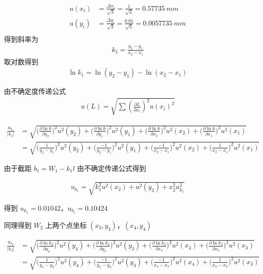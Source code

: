 \documentclass[UTF8]{ctexart}
\begin{document}
\begin{align*}
    u(x_i) &= \frac{\Delta x_i}{\sqrt{3}} = \frac{1}{\sqrt{3}} = 0.57735 \ mm \\
    u(y_i) &= \frac{\Delta y_i}{\sqrt{3}} = \frac{0.01}{\sqrt{3}} = 0.0057735 \ mm \\
\end{align*}
得到斜率为
\begin{align*}
    k_1 = \frac{y_2 - y_1}{x_2 - x_1}
\end{align*}
取对数得到
\begin{align*}
    \ln{k_1} = \ln{(y_2 - y_1)} - \ln{(x_2 - x_1)}
\end{align*}

由不确定度传递公式
\begin{align*}
    u(L) = \sqrt{\sum (\frac{\partial L}{\partial x_i})^2u(x_i)^2 } 
\end{align*}


\begin{align*}
    \frac{u_{k_1}}{|k_1|} &= \sqrt{ 
    \Big(   \frac{\partial \ln{k} }{\partial y_2}        \Big)^2u^2(y_2)     +
    \Big(   \frac{\partial \ln{k} }{\partial y_1}        \Big)^2u^2(y_1)     +
    \Big(   \frac{\partial \ln{k} }{\partial x_2}        \Big)^2u^2(x_2)     +
    \Big(   \frac{\partial \ln{k} }{\partial x_1}        \Big)^2u^2(x_1)  
    } \\
    &= \sqrt{ 
    \Big(   \frac{1 }{y_2 - y_1}        \Big)^2u^2(y_2)     +
    \Big(   \frac{-1 }{y_2 - y_1}        \Big)^2u^2(y_1)     +
    \Big(   \frac{-1 }{x_2 - x_1}        \Big)^2u^2(x_2)     +
    \Big(   \frac{1 }{x_2 - x_1}        \Big)^2u^2(x_1)  
    }
\end{align*}

由于截距 $b_1 = W_1 - k_1l$
由不确定传递公式得到

\begin{align*}
    u_{b_1} = \sqrt{
    k_1^2u^2(x_2) +
    u^2(y_2) +
    x_2^2u^2_{k_1}
     }
\end{align*}

得到 $u_{k_1} = 0.01042$，$u_{b_1} = 0.10424$

同理得到 $W_2$ 上两个点坐标 $(x_3,y_3)$，$(x_4,y_4)$

\begin{align*}
    \frac{u_{k_2}}{|k_2|} &= \sqrt{ 
    \Big(   \frac{\partial \ln{k_2} }{\partial y_4}        \Big)^2u^2(y_4)     +
    \Big(   \frac{\partial \ln{k_2} }{\partial y_3}        \Big)^2u^2(y_3)     +
    \Big(   \frac{\partial \ln{k_2} }{\partial x_4}        \Big)^2u^2(x_4)     +
    \Big(   \frac{\partial \ln{k_2} }{\partial x_3}        \Big)^2u^2(x_3)  
    } \\
    &= \sqrt{ 
    \Big(   \frac{1 }{y_4 - y_3}        \Big)^2u^2(y_4)     +
    \Big(   \frac{-1 }{y_4 - y_3}        \Big)^2u^2(y_3)     +
    \Big(   \frac{-1 }{x_4 - x_3}        \Big)^2u^2(x_4)     +
    \Big(   \frac{1 }{x_4 - x_3}        \Big)^2u^2(x_3)  
    }
\end{align*}
\end{document}
